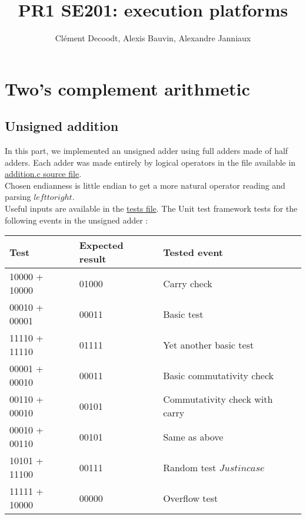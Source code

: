 \documentclass[a4paper]{report}
\author{Clément Decoodt, Alexis Bauvin, Alexandre Janniaux}
\title{PR1 SE201: execution platforms}
\begin{document}
\maketitle

\section{Two's complement arithmetic}

\subsection{Unsigned addition}

	In this part, we implemented an unsigned adder using full adders made of half adders. Each adder was made entirely by logical operators in the file available in \href{https://github.com/friendshipismagic/friendly-computing-machine/blob/master/proj1/src/addition.c}{addition.c source file}. \\
	
	Chosen endianness is little endian to get a more natural operator reading and parsing \(left to right\). \\
	
	Useful inputs are available in the \href{https://github.com/friendshipismagic/friendly-computing-machine/blob/master/proj1/src/tests.c}{tests file}. The Unit test framework tests for the following events in the unsigned adder :

\begin{center}
	\begin{tabular}{|l|l|l|}
		\hline
		Test & Expected result & Tested event \\
		\hline \hline
		10000 + 10000 & 01000 & Carry check \\
		00010 + 00001 & 00011 & Basic test \\
		11110 + 11110 & 01111 & Yet another basic test \\
		00001 + 00010 & 00011 & Basic commutativity check \\
		00110 + 00010 & 00101 & Commutativity check with carry \\
		00010 + 00110 & 00101 & Same as above \\
		10101 + 11100 & 00111 & Random test \( Just in case \)\\
		11111 + 10000 & 00000 & Overflow test \\
		\hline
	\end{tabular}
\end{center}
\end{document}
